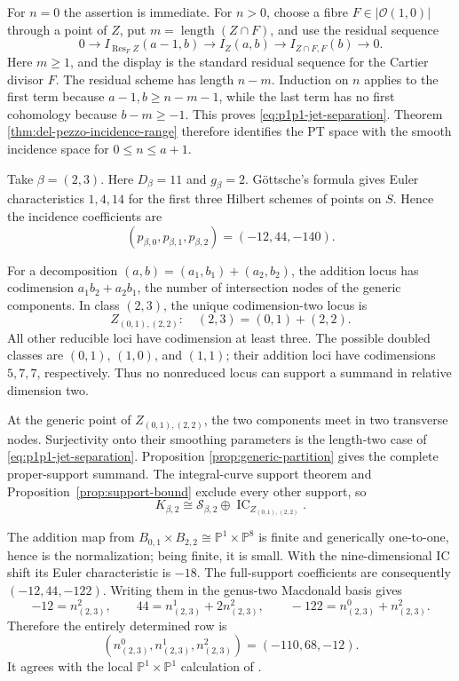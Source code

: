 \documentclass[11pt,reqno]{amsart}
\theoremstyle{definition}
\newcommand{\Pp}{\mathbb P}
\newcommand{\Ocal}{\mathcal O}
\newcommand{\IC}{\operatorname{IC}}
\begin{document}
For $n=0$ the assertion is immediate.  For $n>0$, choose a fibre
\(F\in|\Ocal(1,0)|\) through a point of \(Z\), put
\(m=\operatorname{length}(Z\cap F)\), and use the residual sequence
\[
 0\to I_{\operatorname{Res}_F Z}(a-1,b)
 \to I_Z(a,b)
 \to I_{Z\cap F,F}(b)\to0.
\]
Here $m\ge1$, and the display is the standard residual sequence for the
Cartier divisor $F$.  The residual scheme has length \(n-m\).  Induction
on \(n\) applies to
the first term because \(a-1,b\ge n-m-1\), while the last term has no
first cohomology because \(b-m\ge-1\).  This proves
\eqref{eq:p1p1-jet-separation}.  Theorem
\ref{thm:del-pezzo-incidence-range} therefore identifies the PT space with
the smooth incidence space for \(0\le n\le a+1\).

Take \(\beta=(2,3)\).  Here \(D_\beta=11\) and \(g_\beta=2\).
G\"ottsche's formula gives Euler characteristics \(1,4,14\) for the first
three Hilbert schemes of points on \(S\).  Hence the incidence coefficients
are
\begin{equation}\label{eq:p1p1-23-incidence}
 (p_{\beta,0},p_{\beta,1},p_{\beta,2})=(-12,44,-140).
\end{equation}

For a decomposition \((a,b)=(a_1,b_1)+(a_2,b_2)\), the addition locus has
codimension \(a_1b_2+a_2b_1\), the number of intersection nodes of the
generic components.  In class \((2,3)\), the unique codimension-two locus
is
\[
 Z_{(0,1),(2,2)}:\quad (2,3)=(0,1)+(2,2).
\]
All other reducible loci have codimension at least three.  The possible
doubled classes are \((0,1)\), \((1,0)\), and \((1,1)\); their addition
loci have codimensions \(5,7,7\), respectively.  Thus no nonreduced locus
can support a summand in relative dimension two.

At the generic point of \(Z_{(0,1),(2,2)}\), the two components meet in
two transverse nodes.  Surjectivity onto their smoothing parameters is the
length-two case of \eqref{eq:p1p1-jet-separation}.  Proposition
\ref{prop:generic-partition} gives the complete proper-support summand.
The integral-curve support theorem and Proposition~\ref{prop:support-bound}
exclude every other support, so
\[
 K_{\beta,2}\cong\mathcal S_{\beta,2}
 \oplus\IC_{Z_{(0,1),(2,2)}}.
\]

The addition map from
\(B_{0,1}\times B_{2,2}\cong\Pp^1\times\Pp^8\) is finite and generically
one-to-one, hence is the normalization; being finite, it is small.  With the
nine-dimensional IC shift its Euler characteristic is \(-18\).  The
full-support coefficients are consequently \((-12,44,-122)\).  Writing
them in the genus-two Macdonald basis gives
\[
 -12=n_{(2,3)}^2,\qquad
 44=n_{(2,3)}^1+2n_{(2,3)}^2,\qquad
 -122=n_{(2,3)}^0+n_{(2,3)}^2.
\]
Therefore the entirely determined row is
\begin{equation}\label{eq:p1p1-23-row}
 \boxed{(n_{(2,3)}^0,n_{(2,3)}^1,n_{(2,3)}^2)=(-110,68,-12).}
\end{equation}
It agrees with the local \(\Pp^1\times\Pp^1\) calculation of
\cite{CKK}.
\end{document}
